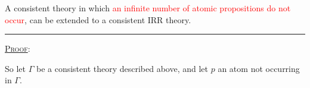 \documentclass[xcolor=x11names]{beamer}
\newcommand{\dzsa}[1]{\textsc{\underline{#1}}:}
\newcommand{\bemph}[1] {{\color{DeepSkyBlue3}{#1}}}
\newcommand{\cemph}[1]{\textcolor{red}{#1}}
\begin{document}
\begin{frame}[t]
\frametitle{\bemph{(IRRExt)}}
\scriptsize

A consistent theory in which \cemph{an infinite number of atomic propositions do not occur}, can be extended to a consistent IRR theory.
\medskip
\hrule
\medskip
\dzsa{Proof}%

So let $\Gamma$ be a consistent theory described above, and let $p$ an atom not occurring in $\Gamma$.


\end{frame}
\end{document}
